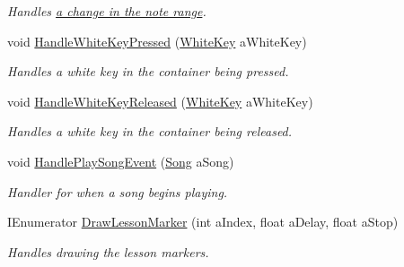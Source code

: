 \begin{DoxyCompactItemize}
\begin{DoxyCompactList}\small\item\em Handles \hyperlink{group___v_i_m_event_types_class_virtual_instrument_manager_1_1_change_note_range_event}{a change in the note range}. \end{DoxyCompactList}\item 
void \hyperlink{group___key_contain_handlers_ga4e2c5e8be389a7514429910e7d61f028}{Handle\+White\+Key\+Pressed} (\hyperlink{class_white_key}{White\+Key} a\+White\+Key)
\begin{DoxyCompactList}\small\item\em Handles a white key in the container being pressed. \end{DoxyCompactList}\item 
void \hyperlink{group___key_contain_handlers_ga5b98b0105300225fd79638525ad3cb3c}{Handle\+White\+Key\+Released} (\hyperlink{class_white_key}{White\+Key} a\+White\+Key)
\begin{DoxyCompactList}\small\item\em Handles a white key in the container being released. \end{DoxyCompactList}\item 
void \hyperlink{group___key_contain_handlers_ga894c823059c5268af0954f83c04036ed}{Handle\+Play\+Song\+Event} (\hyperlink{class_song}{Song} a\+Song)
\begin{DoxyCompactList}\small\item\em Handler for when a song begins playing. \end{DoxyCompactList}\item 
I\+Enumerator \hyperlink{group___key_contain_handlers_gac6b82feca83eaf5e3ce6901088bc552c}{Draw\+Lesson\+Marker} (int a\+Index, float a\+Delay, float a\+Stop)
\begin{DoxyCompactList}\small\item\em Handles drawing the lesson markers. \end{DoxyCompactList}\end{DoxyCompactItemize}
